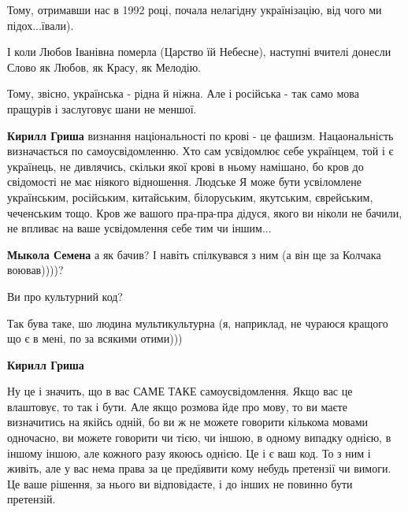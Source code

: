 \begin{itemize}
Тому, отримавши нас в 1992 році, почала нелагідну українізацію, від чого ми
підох...ївали).

І коли Любов Іванівна померла (Царство їй Небесне), наступні вчителі донесли
Слово як Любов, як Красу, як Мелодію.

Тому, звісно, українська - рідна й ніжна. Але і російська - так само мова
пращурів і заслуговує шани не меншої.

\begin{itemize}
 
\textbf{Кирилл Гриша} визнання національності по крові - це фашизм.
Нацаональність визначається по самоусвідомленню. Хто сам усвідомлює себе
українцем, той і є українець, не дивлячись, скільки якої крові в ньому
намішано, бо кров до свідомості не має ніякого відношення. Людське Я може бути
усвіломлене українським, російським, китайським, білоруським, якутським,
єврейським, чеченським тощо. Кров же вашого пра-пра-пра дідуся, якого ви ніколи
не бачили, не впливає на ваше усвідомлення себе тим чи іншим...

 
\textbf{Мыкола Семена} 
а як бачив? І навіть спілкувався з ним (а він ще за Колчака воював))))?

Ви про культурний код?

Так бува таке, шо людина мультикультурна (я, наприклад, не чураюся кращого що є
в мені, по за всякими отими)))

 
\textbf{Кирилл Гриша} 

Ну це і значить, що в вас САМЕ ТАКЕ самоусвідомлення. Якщо вас це влаштовує, то
так і бути. Але якщо розмова йде про мову, то ви маєте визначитись на якійсь
одній, бо ви ж не можете говорити кількома мовами одночасно, ви можете говорити
чи тією, чи іншою, в одному випадку однією, в іншому іншою, але кожного разу
якоюсь однією. Це і є ваш код. То з ним і живіть, але у вас нема права за це
предїявити кому небудь претензії чи вимоги. Це ваше рішення, за нього ви
відповідаєте, і до інших не повинно бути претензій.



\end{itemize}
\end{itemize}
